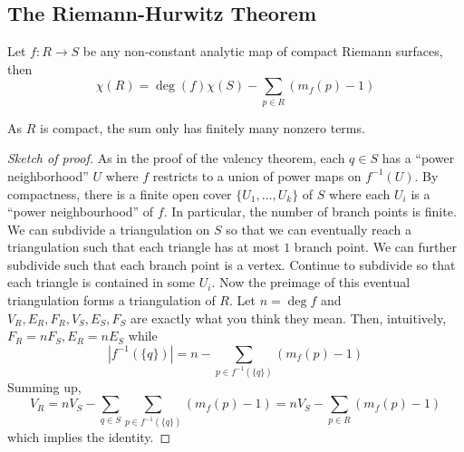 \subsection{The Riemann-Hurwitz Theorem}
\begin{theorem}
    Let $f:R\to S$ be any non-constant analytic map of compact Riemann surfaces, then
    $$\chi(R)=\deg(f)\chi(S)-\sum_{p\in R}(m_f(p)-1)$$
\end{theorem}
\begin{remark}
    As $R$ is compact, the sum only has finitely many nonzero terms.
\end{remark}
\begin{proof}[Sketch of proof]
    As in the proof of the valency theorem, each $q\in S$ has a ``power neighborhood'' $U$ where $f$ restricts to a union of power maps on $f^{-1}(U)$.
    By compactness, there is a finite open cover $\{U_1,\ldots,U_k\}$ of $S$ where each $U_i$ is a ``power neighbourhood'' of $f$.
    In particular, the number of branch points is finite.
    We can subdivide a triangulation on $S$ so that we can eventually reach a triangulation such that each triangle has at most $1$ branch point.
    We can further subdivide such that each branch point is a vertex.
    Continue to subdivide so that each triangle is contained in some $U_i$.
    Now the preimage of this eventual triangulation forms a triangulation of $R$.
    Let $n=\deg f$ and $V_R,E_R,F_R,V_S,E_S,F_S$ are exactly what you think they mean.
    Then, intuitively, $F_R=nF_S,E_R=nE_S$ while
    $$|f^{-1}(\{q\})|=n-\sum_{p\in f^{-1}(\{q\})}(m_f(p)-1)$$
    Summing up,
    $$V_R=nV_S-\sum_{q\in S}\sum_{p\in f^{-1}(\{q\})}(m_f(p)-1)=nV_S-\sum_{p\in R}(m_f(p)-1)$$
    which implies the identity.
\end{proof}